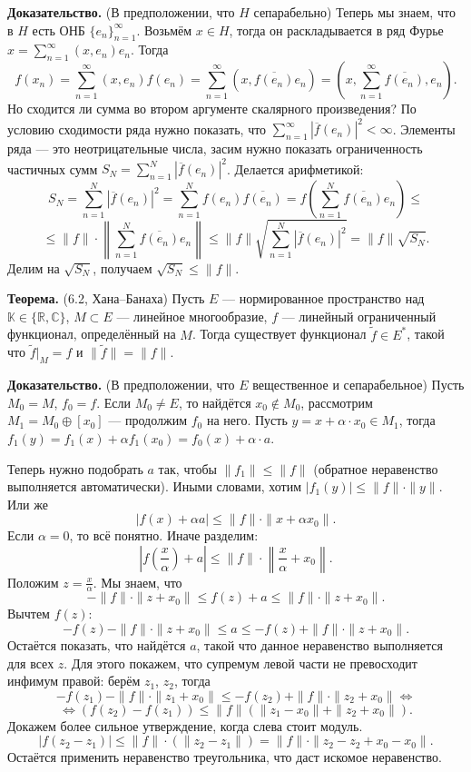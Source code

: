 \textbf{Доказательство.} (В предположении, что $H$ сепарабельно)
Теперь мы знаем, что в $H$ есть ОНБ $\{e_n\}_{n=1}^{\infty}$.
Возьмём $x \in H$, тогда он раскладывается в ряд Фурье $x = \sum_{n=1}^{\infty} (x, e_n) e_n$.
Тогда
\[
    f(x_n) = \sum_{n=1}^{\infty} (x, e_n) f(e_n) = \sum_{n=1}^{\infty} (x, \overline{f(e_n)} e_n) = \left(x, \sum_{n=1}^{\infty} \overline{f(e_n)}, e_n \right).
\]
Но сходится ли сумма во втором аргументе скалярного произведения?
По условию сходимости ряда нужно показать, что $\sum_{n=1}^{\infty} |\overline f(e_n)|^2 < \infty$.
Элементы ряда --- это неотрицательные числа, засим нужно показать ограниченность частичных сумм $S_N = \sum_{n=1}^{N}|\overline f(e_n)|^2$.
Делается арифметикой:
\[
    S_N = \sum_{n=1}^{N} |\overline f(e_n)|^2 = \sum_{n=1}^{N} f(e_n) \overline{f(e_n)} = f \left( \sum_{n=1}^{N} \overline{f(e_n)} e_n \right) \le 
\]
\[
    \le \|f\| \cdot \left\| \sum_{n=1}^{N} \overline{f(e_n)} e_n \right\| \le \|f\| \sqrt{ \sum_{n=1}^{N} |\overline f(e_n)|^2 } = \|f\| \sqrt{S_N}.
\]
Делим на $\sqrt{S_N}$, получаем $\sqrt{S_N} \le \|f\|$.

\QED

\textbf{Теорема.} (6.2, Хана--Банаха) Пусть $E$ --- нормированное пространство над $\mathbb K \in \{\mathbb R, \mathbb C\}$, $M \subset E$ --- линейное многообразие, $f$ --- линейный ограниченный функционал, определённый на $M$.
Тогда существует функционал $\widetilde f \in E^*$, такой что $\widetilde f|_M = f$ и $\|\widetilde f\| = \|f\|$.

\textbf{Доказательство.} (В предположении, что $E$ вещественное и сепарабельное)
Пусть $M_0 = M$, $f_0 = f$.
Если $M_0 \ne E$, то найдётся $x_0 \not\in M_0$, рассмотрим $M_1 = M_0 \oplus [x_0]$ --- продолжим $f_0$ на него.
Пусть $y = x + \alpha \cdot x_0 \in M_1$, тогда $f_1(y) = f_1(x) + \alpha f_1(x_0) = f_0(x) + \alpha \cdot a$.

Теперь нужно подобрать $a$ так, чтобы $\|f_1\| \le \|f\|$ (обратное неравенство выполняется автоматически).
Иными словами, хотим $|f_1(y)| \le \|f\| \cdot \|y\|$.
Или же
\[
    |f(x) + \alpha a| \le \|f\| \cdot \|x + \alpha x_0\|.
\]
Если $\alpha = 0$, то всё понятно.
Иначе разделим:
\[
    \left| f \left(\frac{x}{\alpha} \right) + a \right| \le \|f\| \cdot \left\| \frac{x}{\alpha} + x_0 \right\|.
\]
Положим $z = \frac{x}{\alpha}$.
Мы знаем, что
\[
    -\|f\| \cdot \|z + x_0\| \le f(z) + a \le \|f\| \cdot \|z + x_0\|.
\]
Вычтем $f(z)$:
\[
    -f(z) -\|f\| \cdot \|z + x_0\| \le a \le -f(z) + \|f\| \cdot \|z + x_0\|.
\]
Остаётся показать, что найдётся $a$, такой что данное неравенство выполняется для всех $z$.
Для этого покажем, что супремум левой части не превосходит инфимум правой: берём $z_1$, $z_2$, тогда
\[
    -f(z_1) -\|f\| \cdot \|z_1 + x_0\| \le -f(z_2) + \|f\| \cdot \|z_2 + x_0\| \iff
\]
\[
    \iff (f(z_2) - f(z_1)) \le \|f\| \left( \|z_1 - x_0\| + \|z_2 + x_0\| \right).
\]
Докажем более сильное утверждение, когда слева стоит модуль.
\[
    |f(z_2 - z_1)| \le \|f\| \cdot (\|z_2 - z_1\|) = \|f\| \cdot \|z_2 - z_2 + x_0 - x_0\|.
\]
Остаётся применить неравенство треугольника, что даст искомое неравенство.

